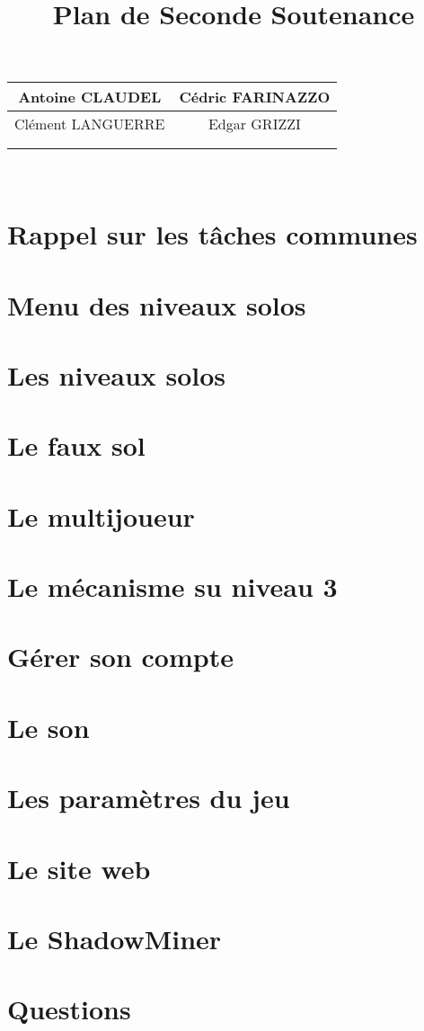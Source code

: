 \documentclass[A4paper,11pt]{article}
\title{\begin{Huge}Plan de Seconde Soutenance\end{Huge}}
\begin{document}
\date{}

\maketitle
\begin{center}

\begin{tabular}{|c|c|}
\hline Antoine CLAUDEL & Cédric FARINAZZO \\
\hline Clément LANGUERRE & Edgar GRIZZI \\
\hline
\multicolumn{2}{c}{} \\
\multicolumn{2}{c}{} \\
\end{tabular}\\
\end{center}
\section{Rappel sur les tâches communes}
\section{Menu des niveaux solos}
\section{Les niveaux solos}
\section{Le faux sol}
\section{Le multijoueur}
\section{Le mécanisme su niveau 3}

\section{Gérer son compte}
\section{Le son}
\section{Les paramètres du jeu}
\section{Le site web}
\section{Le ShadowMiner}
\section{Questions}
\end{document}
